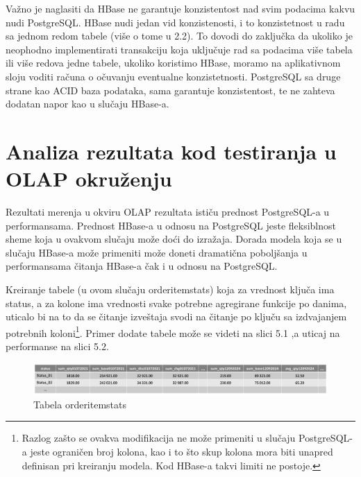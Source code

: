 \documentclass[12pt,oneside]{memoir}
\begin{document}
Važno je naglasiti da HBase ne garantuje konzistentost nad svim podacima kakvu nudi PostgreSQL. HBase nudi jedan vid konzistenosti, i to konzistetnost u radu sa jednom redom tabele (više o tome u 2.2). To dovodi do zaključka da ukoliko je neophodno implementirati transakciju koja uključuje rad sa podacima više tabela ili više redova jedne tabele, ukoliko koristimo HBase, moramo na aplikativnom sloju voditi računa o očuvanju  eventualne konzistetnosti. PostgreSQL sa druge strane kao ACID baza podataka, sama garantuje konzistentost, te ne zahteva dodatan napor kao u slučaju HBase-a. 

\section{Analiza rezultata kod testiranja u OLAP okruženju}

Rezultati merenja u okviru OLAP rezultata ističu prednost PostgreSQL-a u performansama. Prednost HBase-a u odnosu na PostgreSQL jeste fleksiblnost sheme koja u ovakvom slučaju može doći do izražaja. Dorada modela koja se u slučaju HBase-a može primeniti može doneti dramatična poboljšanja u performansama čitanja HBase-a čak i u odnosu na PostgreSQL. 

Kreiranje tabele (u ovom slučaju orderitemstats) koja za vrednost ključa ima status, a za kolone ima vrednosti svake potrebne agregirane funkcije po danima, uticalo bi na to da se čitanje izveštaja svodi na čitanje po ključu sa izdvajanjem potrebnih koloni\footnote{ Razlog zašto se ovakva modifikacija ne može primeniti u slučaju PostgreSQL-a jeste ograničen broj kolona, kao i to što skup kolona mora biti unapred definisan pri kreiranju modela. Kod HBase-a takvi limiti ne postoje.}.
Primer dodate tabele može se videti na slici 5.1 ,a uticaj na performanse na slici 5.2.

\begin{figure}[!ht]
  \centering
  \includegraphics[width=1\textwidth]{denormalized-model.png}
  \caption{Tabela orderitemstats}
  \label{fig:grafikon}
\end{figure}
\end{document}
